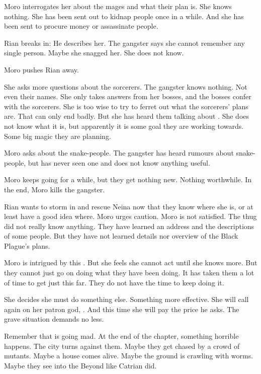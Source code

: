 Moro interrogates her about the mages and what their plan is.
She knows nothing. 
She has been sent out to kidnap people once in a while. 
And she has been sent to procure money or assassinate people. 

Rian breaks in: 
He describes her.
The gangster says she cannot remember any single person.
Maybe she snagged her. 
She does not know. 

Moro pushes Rian away.

She asks more questions about the sorcerers.
The gangster knows nothing. 
Not even their names. 
She only takes answers from her bosses, and the bosses confer with the sorcerers. 
She is too wise to try to ferret out what the sorcerers' plans are.
That can only end badly. 
But she has heard them talking about . 
She does not know what it is, but apparently it is some goal they are working towards. 
Some big magic they are planning. 

Moro asks about the snake-people.
The gangster has heard rumours about snake-people, but has never seen one and does not know anything useful. 



\begin{comment}
  \section{Killing the victim}
\end{comment}

Moro keeps going for a while, but they get nothing new.
Nothing worthwhile. 
In the end, Moro kills the gangster. 

Rian wants to storm in and rescue Neina now that they know where she is, or at least have a good idea where. 
Moro urges caution. 
Moro is not satisfied. 
The thug did not really know anything. 
They have learned an address and the descriptions of some people.
But they have not learned details nor overview of the Black Plague's plans. 

Moro is intrigued by this .
But she feels she cannot act until she knows more. 
But they cannot just go on doing what they have been doing. 
It has taken them a lot of time to get just this far.
They do not have the time to keep doing it.

She decides she must do something else.
Something more effective.
She will call again on her patron god, \Nasshikerr. 
And this time she will pay the price he asks.
The grave situation demands no less. 

Remember that \Malcur is going mad. 
At the end of the chapter, something horrible happens.
The city turns against them.
Maybe they get chased by a crowd of mutants. 
Maybe a house comes alive. 
Maybe the ground is crawling with worms.
Maybe they see into the Beyond like Catrian did. 








